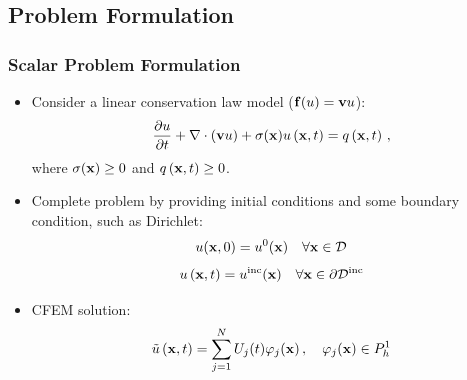 \documentclass{beamer} \useoutertheme{infolines}
\begin{document}
\subsection{Problem Formulation}
\begin{frame}
\frametitle{Scalar Problem Formulation}

\begin{itemize}
  \item Consider a linear conservation law model
    ($\mathbf{f}(u)=\mathbf{v}u$):
    \begin{equation}
      \frac{\partial u}{\partial t} + \nabla\cdot(\mathbf{v}u)
      + \sigma(\mathbf{x})u\left(\mathbf{x},t\right) = q\left(\mathbf{x},t\right) \,,
    \end{equation}
    where $\sigma(\mathbf{x})\ge 0$ and $q\left(\mathbf{x},t\right)\ge 0$.
  \item Complete problem by providing initial conditions and some boundary
    condition, such as Dirichlet:
   \begin{equation}
      u(\mathbf{x},0) = u^0(\mathbf{x}) \quad \forall \mathbf{x}\in \mathcal{D}
   \end{equation}
   \begin{equation}
      u\left(\mathbf{x},t\right) = u^{\text{inc}}(\mathbf{x}) \quad \forall \mathbf{x}\in \partial\mathcal{D}^{\text{inc}}
   \end{equation}
   \item CFEM solution:
   \begin{equation}
      \tilde{u}\left(\mathbf{x},t\right) = \sum\limits_{j=1}^N U_j(t) \varphi_j(\mathbf{x}) \,,
      \quad \varphi_j(\mathbf{x})\in P^1_h
   \end{equation}
\end{itemize}

\end{frame}
\end{document}
